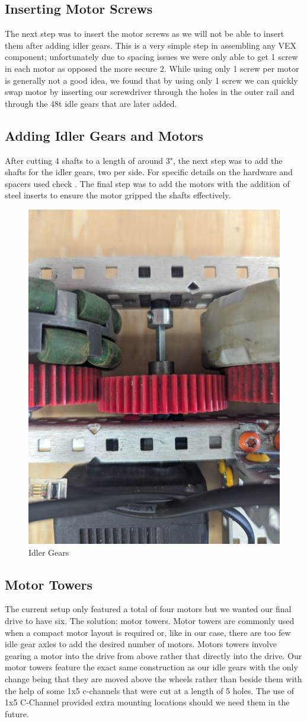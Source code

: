 \subsection*{Inserting Motor Screws}
The next step was to insert the motor screws as we will not be able to insert them after adding idler gears. This is a very simple step in assembling any VEX component; unfortunately due to spacing issues we were only able to get 1 screw in each motor as opposed the more secure 2. While using only 1 screw per motor is generally not a good idea, we found that by using only 1 screw we can quickly swap motor by inserting our screwdriver through the holes in the outer rail and through the 48t idle gears that are later added.

\subsection*{Adding Idler Gears and Motors}
After cutting 4 shafts to a length of around 3", the next step was to add the shafts for the idler gears, two per side. For specific details on the hardware and spacers used check . The final step was to add the motors with the addition of steel inserts to ensure the motor gripped the shafts effectively.
\begin{figure}[b]
    \centering
    \includegraphics[width=0.5\linewidth]{images/Idler Gears.jpeg}
    \caption{Idler Gears}
    \label{fig:idler-gears}
\end{figure}

\subsection*{Motor Towers}
The current setup only featured a total of four motors but we wanted our final drive to have six. The solution: motor towers. Motor towers are commonly used when a compact motor layout is required or, like in our case, there are too few idle gear axles to add the desired number of motors. Motors towers involve gearing a motor into the drive from above rather that directly into the drive. Our motor towers feature the exact same construction as our idle gears with the only change being that they are moved above the wheels rather than beside them with the help of some 1x5 c-channels that were cut at a length of 5 holes. The use of 1x5 C-Channel provided extra mounting locations should we need them in the future.

